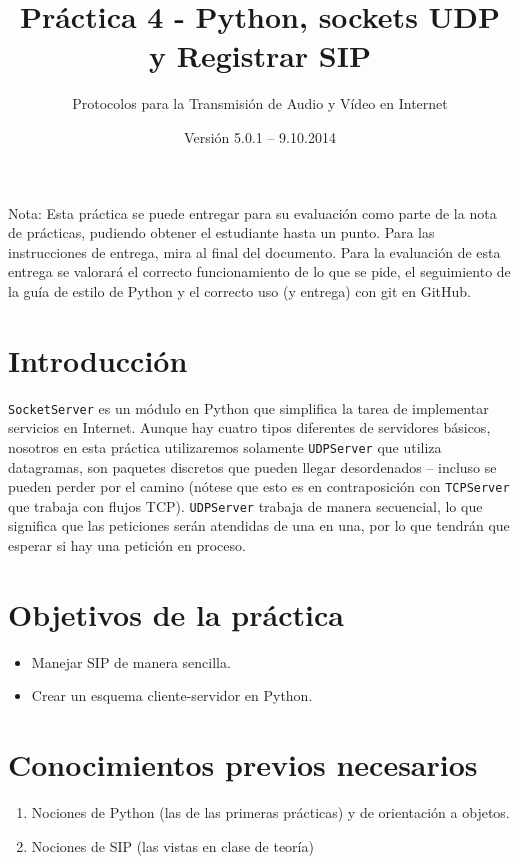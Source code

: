 \documentclass[11pt,a4paper]{article}
\begin{document}
\title{Práctica 4 - Python, sockets UDP y Registrar SIP}
\author{Protocolos para la Transmisión de Audio y Vídeo en Internet}
\date{Versión 5.0.1 – 9.10.2014}


\maketitle

Nota: Esta práctica se puede entregar para su evaluación como parte de la nota de prácticas, pudiendo obtener el estudiante hasta un punto. Para las instrucciones de entrega, mira al final del documento. Para la evaluación de esta entrega se valorará el correcto funcionamiento de lo que se pide, el seguimiento de la guía de estilo de Python y el correcto uso (y entrega) con git en GitHub.

\section{Introducción}

\texttt{SocketServer} es un módulo en Python que simplifica la tarea de implementar servicios en Internet. Aunque hay cuatro tipos diferentes de servidores básicos, nosotros en esta práctica utilizaremos solamente \texttt{UDPServer} que utiliza datagramas, son paquetes discretos que pueden llegar desordenados – incluso se pueden perder por el camino (nótese que esto es en contraposición con \texttt{TCPServer} que trabaja con flujos TCP). \texttt{UDPServer} trabaja de manera secuencial, lo que significa que las peticiones serán atendidas de una en una, por lo que tendrán que esperar si hay una petición en proceso.

\section{Objetivos de la práctica}

\begin{itemize}
  \item Manejar SIP de manera sencilla.
  \item Crear un esquema cliente-servidor en Python.
\end{itemize}

\section{Conocimientos previos necesarios}

\begin{enumerate}
  \item Nociones de Python (las de las primeras prácticas) y de orientación a objetos.
  \item Nociones de SIP (las vistas en clase de teoría)
\end{enumerate}
\end{document}
